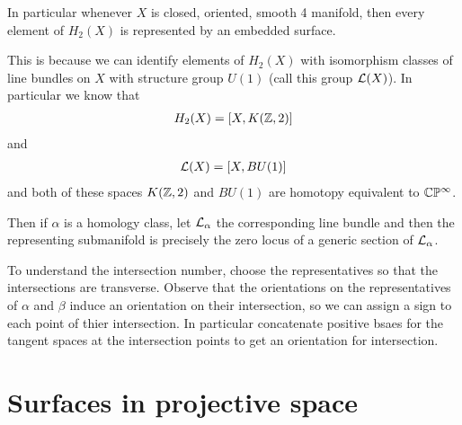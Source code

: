 \documentclass[12pt]{article}
\begin{document}
\begin{remark}
	In particular whenever $X$ is closed,
	oriented, smooth 4 manifold, then every element of $H_2(X)$ is represented by an embedded
	surface.
    
    \hfill
    
    This is because we can identify elements of $H_2(X)$ with isomorphism classes
	of line bundles on $X$ with structure group $U(1)$ (call this group ${\mathcal{L}}(X)$). In particular we know that \begin{align*}
		H_2(X) = [X,K(\mathbb{Z},2)]
	\end{align*} and \begin{align*}
		{\mathcal{L}}(X) = [X,BU(1)]
	\end{align*} and both of these spaces $K(\mathbb{Z},2)$ and $BU(1)$ are homotopy
	equivalent to $\mathbb{C}\mathbb{P}^\infty$.

    \hfill

    Then if $\alpha$ is a homology class, let ${\mathcal{L}}_\alpha$ the corresponding line bundle
    and then the representing submanifold is precisely the zero locus of a generic section
    of ${\mathcal{L}}_\alpha$.
\end{remark}

To understand the intersection number, choose the
representatives so that the intersections are transverse. 
Observe that the orientations on the
representatives of $\alpha$ and $\beta$ induce an orientation on their intersection,
so we can assign a sign to each point of thier intersection. In particular
concatenate positive bsaes for the tangent spaces at the intersection points
to get an orientation for intersection.




\section{Surfaces in projective space}
\end{document}
